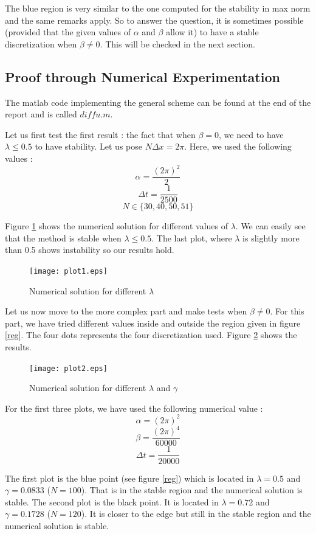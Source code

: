 The blue region is very similar to the one computed for the stability in max norm and the same remarks apply. So to answer the question, it is sometimes possible (provided that the given values of $\alpha$ and $\beta$ allow it) to have a stable discretization when $\beta \neq 0$. This will be checked in the next section.

\subsection{Proof through Numerical Experimentation}
The matlab code implementing the general scheme can be found at the end of the report and is called $diffu.m$.

Let us first test the first result : the fact that when $\beta = 0$, we need to have $\lambda \leq 0.5$ to have stability. Let us pose $N\Delta x = 2\pi$. Here, we used the following values : 
$$\alpha = \frac{(2\pi)^2}{2}$$
$$\Delta t = \frac{1}{2500}$$
$$ N \in \{30,40,50,51\}$$

Figure \ref{plot1} shows the numerical solution for different values of $\lambda$. We can easily see that the method is stable when $\lambda \leq 0.5$. The last plot, where $\lambda$ is slightly more than 0.5 shows instability so our results hold.

\begin{figure}
\begin{center}
\texttt{[image: plot1.eps]}
\caption{Numerical solution for different $\lambda$}
\label{plot1}
\end{center}
\end{figure}

Let us now move to the more complex part and make tests when $\beta \neq 0$. For this part, we have tried different values inside and outside the region given in figure \ref{reg}. The four dots represents the four discretization used. Figure \ref{plot2} shows the results.

\begin{figure}
\begin{center}
\texttt{[image: plot2.eps]}
\caption{Numerical solution for different $\lambda$ and $\gamma$}
\label{plot2}
\end{center}
\end{figure}

For the first three plots, we have used the following numerical value : 
$$\alpha = (2\pi)^2$$
$$\beta = \frac{(2\pi)^4}{60000}$$
$$\Delta t = \frac{1}{20000}$$

The first plot is the blue point (see figure \ref{reg}) which is located in $\lambda = 0.5$ and $\gamma = 0.0833$ ($N=100$). That is in the stable region and the numerical solution is stable. The second plot is the black point. It is located in $\lambda = 0.72$ and $\gamma = 0.1728$ ($N=120$). It is closer to the edge but still in the stable region and the numerical solution is stable.

